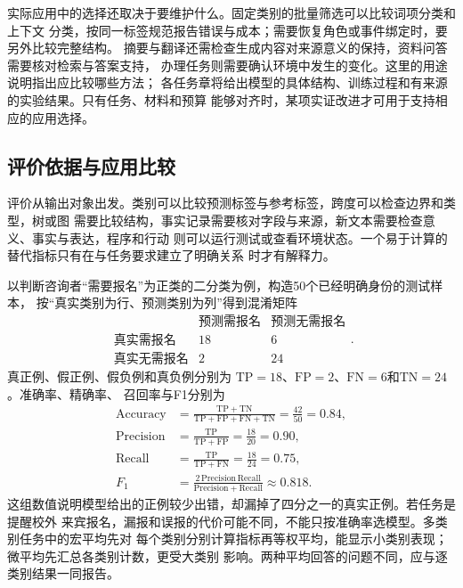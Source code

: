 实际应用中的选择还取决于要维护什么。固定类别的批量筛选可以比较词项分类和上下文
分类，按同一标签规范报告错误与成本；需要恢复角色或事件绑定时，要另外比较完整结构。
摘要与翻译还需检查生成内容对来源意义的保持，资料问答需要核对检索与答案支持，
办理任务则需要确认环境中发生的变化。这里的用途说明指出应比较哪些方法；
各任务章将给出模型的具体结构、训练过程和有来源的实验结果。只有任务、材料和预算
能够对齐时，某项实证改进才可用于支持相应的应用选择。

\subsection{评价依据与应用比较}
\label{sec:nlp-evaluation-and-comparison}

评价从输出对象出发。类别可以比较预测标签与参考标签，跨度可以检查边界和类型，树或图
需要比较结构，事实记录需要核对字段与来源，新文本需要检查意义、事实与表达，程序和行动
则可以运行测试或查看环境状态。一个易于计算的替代指标只有在与任务要求建立了明确关系
时才有解释力。

以判断咨询者“需要报名”为正类的二分类为例，构造50个已经明确身份的测试样本，
按“真实类别为行、预测类别为列”得到混淆矩阵
\[
 \begin{array}{c|rr}
  & \text{预测需报名} & \text{预测无需报名}\\ \hline
  \text{真实需报名} & 18 & 6\\
  \text{真实无需报名} & 2 & 24
 \end{array}.
\]
真正例、假正例、假负例和真负例分别为
$\mathrm{TP}=18$、$\mathrm{FP}=2$、$\mathrm{FN}=6$和$\mathrm{TN}=24$。准确率、精确率、
召回率与F1分别为
\begin{align}
  \mathrm{Accuracy}
  &= \frac{\mathrm{TP}+\mathrm{TN}}
           {\mathrm{TP}+\mathrm{FP}+\mathrm{FN}+\mathrm{TN}}
   = \frac{42}{50}=0.84, \\
  \mathrm{Precision}
  &= \frac{\mathrm{TP}}{\mathrm{TP}+\mathrm{FP}}
   = \frac{18}{20}=0.90, \\
  \mathrm{Recall}
  &= \frac{\mathrm{TP}}{\mathrm{TP}+\mathrm{FN}}
   = \frac{18}{24}=0.75, \\
  F_1
  &= \frac{2\,\mathrm{Precision}\,\mathrm{Recall}}
           {\mathrm{Precision}+\mathrm{Recall}}
   \approx 0.818.
  \label{eq:nlp-classification-metrics}
\end{align}
这组数值说明模型给出的正例较少出错，却漏掉了四分之一的真实正例。若任务是提醒校外
来宾报名，漏报和误报的代价可能不同，不能只按准确率选模型。多类别任务中的宏平均先对
每个类别分别计算指标再等权平均，能显示小类别表现；微平均先汇总各类别计数，更受大类别
影响。两种平均回答的问题不同，应与逐类别结果一同报告。


